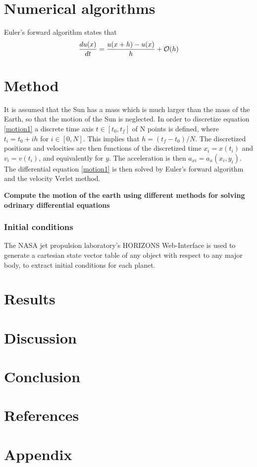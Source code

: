 \documentclass[%
reprint,nofootinbib,
amsmath,amssymb,
aps,
]{revtex4-1}
\begin{document}
\section{Numerical algorithms}
Euler's forward algorithm states that
\begin{equation}
	\dfrac{du(x)}{dt} = \dfrac{u(x+h)-u(x)}{h} + \order{h}
\end{equation}

\section{Method} \noindent 
It is assumed that the Sun has a mass which is much larger than the mass of the Earth, so that the motion of the Sun is neglected. In order to discretize equation \ref{motion1} a discrete time axis $t\in[t_0, t_{f}]$ of N points is defined, where $t_i = t_0 + ih$ for $i\in[0,N]$. This implies that $h = (t_f-t_0)/N$. The discretized positions and velocities are then functions of the discretized time $x_i = x(t_i)$ and $v_i = v(t_i)$, and equivalently for $y$. The acceleration is then $a_{xi} = a_x(x_i,y_i)$. \\
The differential equation \ref{motion1} is then solved by Euler's forward algorithm and the velocity Verlet method. 


 
\textbf{Compute the motion of the earth using different methods for solving odrinary differential equations} \\ 
\subsubsection{Initial conditions} \noindent 
The NASA jet propulsion laboratory's HORIZONS Web-Interface is used to generate a cartesian state vector table of any object with respect to any major body, to extract initial conditions for each planet. 
\section{Results} \noindent 
\section{Discussion} \noindent
\section{Conclusion} \noindent  




\onecolumngrid 
\newpage 
\section{References}
{}


\section{Appendix}
\end{document}
